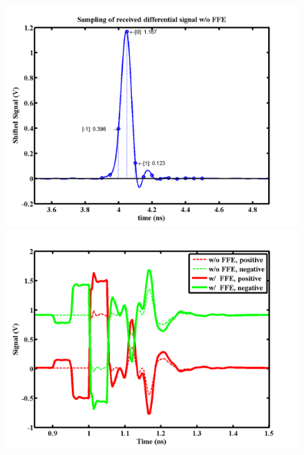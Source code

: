 \documentclass{book}  %
\begin{document}
\begin{paper}
\begin{figure}[htbp!]
	\centering	
	\begin{minipage}[tb]{0.5\textwidth}
		\centering	
		\includegraphics[width=\textwidth]{./img/Verilog/20G/2_sampling.png}
	\end{minipage}%
	\begin{minipage}[tb]{0.5\textwidth}
		\centering	
		\includegraphics[width=\textwidth]{./img/Verilog/20G/1.png}
	\end{minipage}%
\end{figure}	
\begin{figure}[htbp!]	

\end{figure}
\end{paper}
\end{document}

